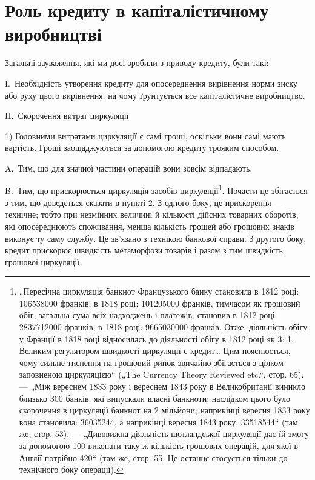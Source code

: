 
\section{Роль кредиту в капіталістичному виробництві}

Загальні зауваження, які ми досі зробили з приводу кредиту,
були такі:

I.~Необхідність утворення кредиту для опосереднення вирівнення норми зиску або руху цього
вирівнення, на чому ґрунтується все капіталістичне виробництво.

II.~Скорочення витрат циркуляції.

1) Головними витратами циркуляції є самі гроші, оскільки
вони самі мають вартість. Гроші заощаджуються за допомогою
кредиту трояким способом.

A.~Тим, що для значної частини операцій вони зовсім відпадають.

B.~Тим, що прискорюється циркуляція засобів циркуляції\footnote{
„Пересічна циркуляція банкнот Французького банку становила в 1812 році:
\num{106538000} франків; в 1818 році: \num{101205000} франків, тимчасом як грошовий обіг,
загальна сума всіх надходжень і платежів, становив в 1812 році: \num{2837712000}
франків; в 1818 році: \num{9665030000} франків. Отже, діяльність обігу у Франції
в 1818 році відносилась до діяльності обігу в 1812 році як 3: 1. Великим регулятором швидкості
циркуляції є кредит\dots{} Цим пояснюється, чому сильне тиснення на грошовий ринок звичайно збігається з
цілком заповненою циркуляцією“ („The Currency Theory Reviewed etc.“, стор. 65). — „Між вереснем 1833
року
і вереснем 1843 року в Великобританії виникло близько 300 банків, які випускали власні банкноти;
наслідком цього було скорочення в циркуляції банкнот
на 2 мільйони; наприкінці вересня 1833 року вона становила: \num{36035244}, а
наприкінці вересня 1843 року: \num{33518544}“
(там же, стор. 53). — „Дивовижна діяльність шотландської циркуляції дає їй
змогу за допомогою 100 виконати таку ж кількість грошових
операцій, для якої в Англії потрібно 420“ (там же, стор. 55.
Це останнє стосується тільки до технічного боку операції).
}.
Почасти це збігається з тим, що доведеться сказати в пункті 2.
З одного боку, це прискорення — технічне; тобто при незмінних
величині й кількості дійсних товарних оборотів, які опосереднюють споживання, менша кількість грошей
або грошових знаків
виконує ту саму службу. Це зв’язано з технікою банкової справи.
З другого боку, кредит прискорює швидкість метаморфози товарів і разом з тим швидкість грошової
циркуляції.

